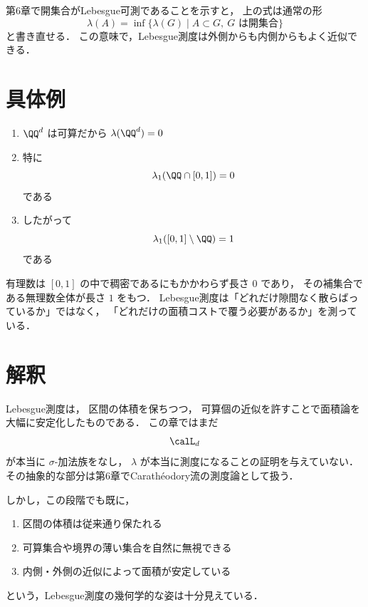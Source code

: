 \begin{remark}
第6章で開集合がLebesgue可測であることを示すと，
上の式は通常の形
\[
\lambda(A)
=
\inf\{\lambda(G)\mid A \subset G,\ G \text{ は開集合}\}
\]
と書き直せる．
この意味で，Lebesgue測度は外側からも内側からもよく近似できる．
\end{remark}

\section{具体例}

\begin{example}
\begin{enumerate}
    \item $\QQ^d$ は可算だから $\lambda(\QQ^d)=0$
    \item 特に
    \[
    \lambda_1(\QQ \cap [0,1])=0
    \]
    である
    \item したがって
    \[
    \lambda_1([0,1]\setminus \QQ)=1
    \]
    である
\end{enumerate}
\end{example}

\begin{remark}
有理数は $[0,1]$ の中で稠密であるにもかかわらず長さ $0$ であり，
その補集合である無理数全体が長さ $1$ をもつ．
Lebesgue測度は「どれだけ隙間なく散らばっているか」ではなく，
「どれだけの面積コストで覆う必要があるか」を測っている．
\end{remark}

\section{解釈}

Lebesgue測度は，
区間の体積を保ちつつ，
可算個の近似を許すことで面積論を大幅に安定化したものである．
この章ではまだ
\[
\calL_d
\]
が本当に $\sigma$-加法族をなし，
$\lambda$ が本当に測度になることの証明を与えていない．
その抽象的な部分は第6章でCarathéodory流の測度論として扱う．

しかし，この段階でも既に，
\begin{enumerate}
    \item 区間の体積は従来通り保たれる
    \item 可算集合や境界の薄い集合を自然に無視できる
    \item 内側・外側の近似によって面積が安定している
\end{enumerate}
という，Lebesgue測度の幾何学的な姿は十分見えている．
